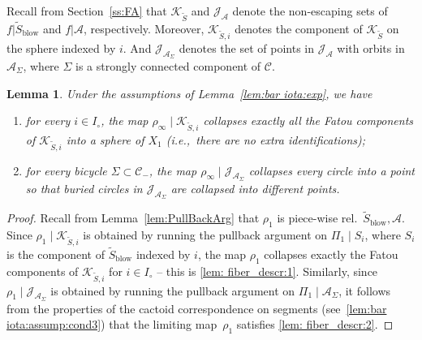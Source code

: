 \documentclass{amsart}
\theoremstyle{plain}
\newtheorem{lemma}[theorem]{Lemma}
\theoremstyle{definition}
\theoremstyle{remark}
\renewcommand{\AA}{{\mathcal A}}
\newcommand{\blowup}{{\operatorname{blow}}}
\newcommand{\filled}{{\mathcal K}}
\newcommand{\Jul}{{\mathcal J}}
\newcommand{\CC}{{\mathcal C}}
\begin{document}
Recall from Section~\ref{ss:FA} that $\filled_{\widetilde S}$ and $\Jul_{\AA}$ denote the non-escaping sets of $f|\widetilde S_\blowup$ and $f|\AA$, respectively. Moreover, $\filled_{\widetilde S,i}$ denotes the component of $\filled_{\widetilde S}$ on the sphere indexed by $i$. And $\Jul_{\AA_\Sigma}$ denotes the set of points in $\Jul_\AA$ with orbits in $\AA_\Sigma$, where $\Sigma$ is a strongly connected component of $\CC$.
\begin{lemma}\label{lem: fiber_descr}
Under the assumptions of Lemma~\ref{lem:bar iota:exp}, we have
\begin{enumerate}[label=\text{(\Roman*)},font=\normalfont,leftmargin=*]
\item\label{lem: fiber_descr:1} for every $i\in I_\circ$, the map $\rho_\infty \mid \filled_{\widetilde S, i}$ collapses exactly all the Fatou components of $\filled_{\widetilde S, i}$ into a sphere of $X_1$ (i.e.,~there are no extra identifications);
\item\label{lem: fiber_descr:2} for every bicycle $\Sigma\subset \CC_-$, the map $\rho_\infty\mid \Jul_{\AA_\Sigma}$ collapses every circle into a point so that buried circles in $\Jul_{\AA_\Sigma}$ are collapsed into different points.
\end{enumerate}
\end{lemma}

\begin{proof} Recall from Lemma~\ref{lem:PullBackArg} that $\rho_1$ is piece-wise rel.\ $\widetilde S_\blowup, \AA$. Since $\rho_{1}\mid \filled_{\widetilde S,i}$ is obtained by running the pullback argument on $\Pi_1\mid S_i$, where $S_i$ is the component of $\widetilde S_\blowup$ indexed by $i$, the map $\rho_1$ collapses exactly the Fatou components of $\filled_{\widetilde S,i}$ for $i\in I_\circ$ -- this is \ref{lem: fiber_descr:1}. Similarly, since $\rho_1\mid \Jul_{\AA_\Sigma}$ is obtained by running the pullback argument on $\Pi_1\mid \AA_\Sigma$, it follows from the properties of the cactoid correspondence on segments (see~\ref{lem:bar iota:assump:cond3}) that the limiting map~$\rho_1$ satisfies \ref{lem: fiber_descr:2}. 
\end{proof}
\end{document}
